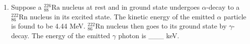 
\begin{enumerate}
    \item Suppose a \(_{88}^{226}\text{Ra}\) nucleus at rest and in ground state undergoes \(\alpha\)-decay to a \(_{86}^{222}\text{Rn}\) nucleus in its excited state. The kinetic energy of the emitted \(\alpha\) particle is found to be 4.44 MeV. \(_{86}^{222}\text{Rn}\) nucleus then goes to its ground state by \(\gamma\)-decay. The energy of the emitted \(\gamma\) photon is \_\_\_ keV. \\
    [Given: atomic mass of \(_{88}^{226}\text{Ra}\) = 226.005 u, atomic mass of \(_{86}^{222}\text{Rn}\) = 222.000 u, atomic mass of \(\alpha\) particle = 4.000 u, 1 u = 931 MeV/c\(^2\), c is speed of the light]
\end{enumerate}
